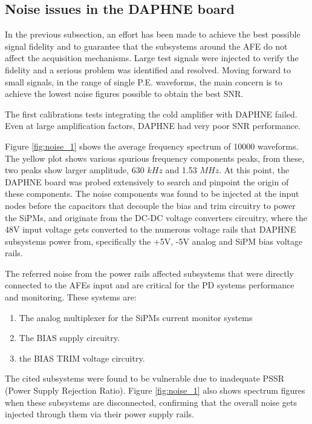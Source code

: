 \subsection{Noise issues in the DAPHNE board}

In the previous subsection, an effort has been made to achieve the best possible signal fidelity and to guarantee that the subsystems around the AFE do not affect the acquisition mechanisms. Large test signals were injected to verify the fidelity and a serious problem was identified and resolved. Moving forward to small signals, in the range of single P.E. waveforms, the main concern is to achieve the lowest noise figures possible to obtain the best SNR. 

The first calibrations tests integrating the cold amplifier with DAPHNE failed. Even at large amplification factors, DAPHNE had very poor SNR performance.  

Figure \ref{fig:noise_1} shows the average frequency spectrum of 10000 waveforms. The yellow plot shows various spurious frequency components peaks, from these, two peaks show larger amplitude, 630 $kHz$ and 1.53 $MHz$. At this point, the DAPHNE board was probed extensively to search and pinpoint the origin of these components. The noise components was found to be injected at the input nodes before the capacitors that decouple the bias and trim circuitry to power the SiPMs, and originate from the DC-DC voltage converters circuitry, where the 48V input voltage gets converted to the numerous voltage rails that DAPHNE subsystems power from, specifically the +5V, -5V analog and SiPM bias voltage rails.

The referred noise from the power rails affected subsystems that were directly connected to the AFEs input and are critical for the PD systems performance and monitoring. These systems are:

\begin{enumerate}
    \item The analog multiplexer for the SiPMs current monitor systems
    \item The BIAS supply circuitry.
    \item the BIAS TRIM voltage circuitry. 
\end{enumerate}

The cited subsystems were found to be vulnerable due to inadequate PSSR (Power Supply Rejection Ratio). Figure \ref{fig:noise_1} also shows spectrum figures when these subsystems are disconnected, confirming that the overall noise gets injected through them via their power supply rails. 

